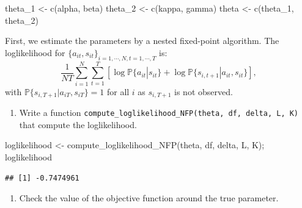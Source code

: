 \documentclass[
]{book}
\newenvironment{Shaded}{\begin{snugshade}}{\end{snugshade}}
\newcommand{\FunctionTok}[1]{\textcolor[rgb]{0.00,0.00,0.00}{#1}}
\newcommand{\NormalTok}[1]{#1}
\newcommand{\OtherTok}[1]{\textcolor[rgb]{0.56,0.35,0.01}{#1}}
\providecommand{\tightlist}{%
  \setlength{\itemsep}{0pt}\setlength{\parskip}{0pt}}
\begin{document}
\begin{Shaded}
\begin{Highlighting}[]
\NormalTok{theta\_1 }\OtherTok{\textless{}{-}} \FunctionTok{c}\NormalTok{(alpha, beta)}
\NormalTok{theta\_2 }\OtherTok{\textless{}{-}} \FunctionTok{c}\NormalTok{(kappa, gamma)}
\NormalTok{theta }\OtherTok{\textless{}{-}} \FunctionTok{c}\NormalTok{(theta\_1, theta\_2)}
\end{Highlighting}
\end{Shaded}

First, we estimate the parameters by a nested fixed-point algorithm. The loglikelihood for \(\{a_{it}, s_{it}\}_{i = 1, \cdots, N, t = 1, \cdots, T}\) is:
\[
\frac{1}{NT} \sum_{i = 1}^N \sum_{t = 1}^T[\log\mathbb{P}\{a_{it}|s_{it}\} + \log \mathbb{P}\{s_{i, t + 1}|a_{it}, s_{it}\}],
\]
with \(\mathbb{P}\{s_{i, T + 1}|a_{iT}, s_{iT}\} = 1\) for all \(i\) as \(s_{i, T + 1}\) is not observed.

\begin{enumerate}
\def\labelenumi{\arabic{enumi}.}
\setcounter{enumi}{1}
\tightlist
\item
  Write a function \texttt{compute\_loglikelihood\_NFP(theta,\ df,\ delta,\ L,\ K)} that compute the loglikelihood.
\end{enumerate}

\begin{Shaded}
\begin{Highlighting}[]
\NormalTok{loglikelihood }\OtherTok{\textless{}{-}} \FunctionTok{compute\_loglikelihood\_NFP}\NormalTok{(theta, df, delta, L, K); loglikelihood}
\end{Highlighting}
\end{Shaded}

\begin{verbatim}
## [1] -0.7474961
\end{verbatim}

\begin{enumerate}
\def\labelenumi{\arabic{enumi}.}
\setcounter{enumi}{2}
\tightlist
\item
  Check the value of the objective function around the true parameter.
\end{enumerate}
\end{document}
